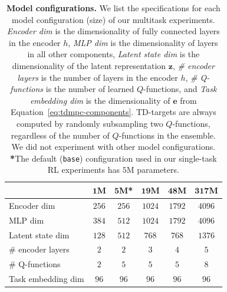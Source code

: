 \documentclass{article}
\begin{document}
\begin{table}[h]
\centering
\parbox{\textwidth}{
\caption{\textbf{Model configurations.} We list the specifications for each model configuration (size) of our multitask experiments. \emph{Encoder dim} is the dimensionality of fully connected layers in the encoder $h$, \emph{MLP dim} is the dimensionality of layers in all other components, \emph{Latent state dim} is the dimensionality of the latent representation $\mathbf{z}$, \emph{\# encoder layers} is the number of layers in the encoder $h$, \emph{\# Q-functions} is the number of learned $Q$-functions, and \emph{Task embedding dim} is the dimensionality of $\mathbf{e}$ from Equation~\ref{eq:tdmpc-components}. TD-targets are always computed by randomly subsampling two $Q$-functions, regardless of the number of $Q$-functions in the ensemble. We did not experiment with other model configurations. \textbf{*}The default (\texttt{base}) configuration used in our single-task RL experiments has $5$M parameters.}
\label{tab:model-configurations}
\centering
\begin{tabular}{@{}lccccc@{}}
\toprule
& $\mathbf{1}$\textbf{M} & $\mathbf{5}$\textbf{M*} & $\mathbf{19}$\textbf{M} & $\mathbf{48}$\textbf{M} & $\mathbf{317}$\textbf{M} \\ \midrule
Encoder dim & $256$ & $256$ & $1024$ & $1792$ & $4096$ \\
MLP dim & $384$ & $512$ & $1024$ & $1792$ & $4096$ \\
Latent state dim & $128$ & $512$ & $768$ & $768$ & $1376$ \\
\# encoder layers & $2$ & $2$ & $3$ & $4$ & $5$ \\
\# Q-functions  & $2$ & $5$ & $5$ & $5$ & $8$ \\
Task embedding dim  & $96$ & $96$ & $96$ & $96$ & $96$ \\ \bottomrule
\end{tabular}%
}
\end{table}
\end{document}
